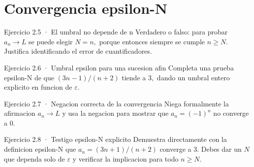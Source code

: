 \documentclass[10pt,a4paper,oneside,openany]{book}
\begin{document}
\section{Convergencia epsilon-N}
\begin{PSevenExerciseFixed}{Ejercicio 2.5 · El umbral no depende de n}
Verdadero o falso: para probar \(a_n\to L\) se puede elegir \(N=n,\) porque entonces siempre se cumple \(n\ge N\). Justifica identificando el error de cuantificadores.
\end{PSevenExerciseFixed}
\begin{PSevenExerciseFixed}{Ejercicio 2.6 · Umbral epsilon para una sucesion afin}
Completa una prueba epsilon-N de que \((3n-1)/(n+2)\) tiende a \(3,\) dando un umbral entero explicito en funcion de \(\varepsilon \).
\end{PSevenExerciseFixed}
\begin{PSevenExerciseFixed}{Ejercicio 2.7 · Negacion correcta de la convergencia}
Niega formalmente la afirmacion \(a_n\to L\) y usa la negacion para mostrar que \(a_n=(-1)^n\) no converge a \(0\).
\end{PSevenExerciseFixed}
\begin{PSevenExerciseFixed}{Ejercicio 2.8 · Testigo epsilon-N explicito}
Demuestra directamente con la definicion epsilon-N que \(a_n=(3n+1)/(n+2)\) converge a \(3\). Debes dar un \(N\) que dependa solo de \(\varepsilon \) y verificar la implicacion para todo \(n\ge N\).
\end{PSevenExerciseFixed}
\end{document}
